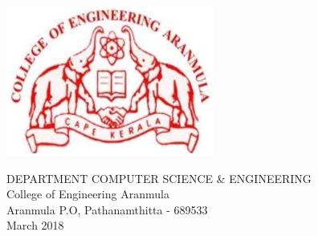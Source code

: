 \begin{titlepage}
\begin{center}
    \includegraphics[scale=0.8]{./images/logo}
	
	\flushbottom
    \vspace{0.3 cm}
    \Large
    \MakeUppercase{Department Computer Science \& Engineering} \\
    \large
    College of Engineering Aranmula \\
    {Aranmula P.O, Pathanamthitta - 689533} \\
    March 2018
  \end{center}
\end{titlepage}
